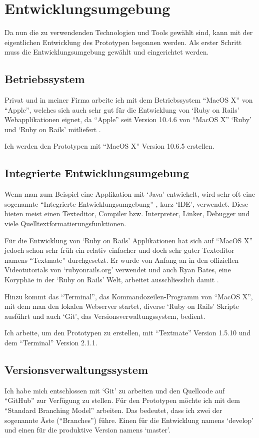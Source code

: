 \section{Entwicklungsumgebung}
Da nun die zu verwendenden Technologien und Tools gewählt sind, kann mit der
eigentlichen Entwicklung des Prototypen begonnen werden. Als erster Schritt
muss die Entwicklungsumgebung gewählt und eingerichtet werden.

\subsection{Betriebssystem}
Privat und in meiner Firma arbeite ich mit dem Betriebssystem ``MacOS X'' von ``Apple'',
welches sich auch sehr gut für die Entwicklung von `Ruby on Rails' Webapplikationen
eignet, da ``Apple'' seit Version 10.4.6 von ``MacOS X'' `Ruby' und `Ruby on Rails' 
mitliefert \cite{macosx}.

Ich werden den Prototypen mit ``MacOS X'' Version 10.6.5 erstellen.

\subsection{Integrierte Entwicklungsumgebung}
Wenn man zum Beispiel eine Applikation mit `Java' entwickelt, wird sehr oft eine
sogenannte ``Integrierte Entwicklungsumgebung'' \cite{ide}, kurz `IDE', verwendet.
Diese bieten meist einen Texteditor, Compiler bzw. Interpreter, Linker, Debugger
und viele Quelltextformatierungsfunktionen.

Für die Entwicklung von `Ruby on Rails' Applikationen hat sich auf ``MacOS X''
jedoch schon sehr früh ein relativ einfacher und doch sehr guter Texteditor
namens ``Textmate'' durchgesetzt. Er wurde von Anfang an in den offiziellen Videotutorials 
von `rubyonrails.org' verwendet und auch Ryan Bates, eine Koryphäe in der
`Ruby on Rails' Welt, arbeitet ausschliesslich damit \cite{ryanbates}. 

Hinzu kommt das ``Terminal'', das Kommandozeilen-Programm von ``MacOS X'', mit
dem man den lokalen Webserver startet, diverse `Ruby on Rails' Skripte ausführt
und auch `Git', das Versionsverwaltungssystem, bedient.

Ich arbeite, um den Prototypen zu erstellen, mit ``Textmate'' Version 1.5.10
und dem ``Terminal'' Version 2.1.1.

\subsection{Versionsverwaltungssystem}
Ich habe mich entschlossen mit `Git' zu arbeiten und den Quellcode auf ``GitHub''
zur Verfügung zu stellen. Für den Prototypen möchte ich mit dem 
``Standard Branching Model'' \cite{branching_model} arbeiten. Das bedeutet, dass ich
zwei der sogenannte Äste (``Branches'') führe. Einen für die Entwicklung namens 
`develop' und einen für die produktive Version namens `master'.

